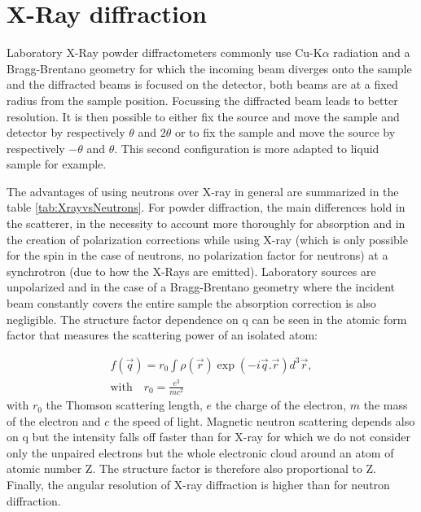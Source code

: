 \section{X-Ray diffraction}

Laboratory X-Ray powder diffractometers commonly use Cu-K$\alpha$ radiation and a Bragg-Brentano geometry for which the incoming beam diverges onto the sample and the diffracted beams is focused on the detector, both beams are at a fixed radius from the sample position. Focussing the diffracted beam leads to better resolution.
It is then possible to either fix the source and move the sample and detector by respectively $\theta$ and $2\theta$ or to fix the sample and move the source by respectively $-\theta$ and $\theta$. This second configuration is more adapted to liquid sample for example.

The advantages of using neutrons over X-ray in general are summarized in the table \ref{tab:XrayvsNeutrons}. For powder diffraction, the main differences hold in the scatterer, in the necessity to account more thoroughly for absorption and in the creation of polarization corrections while using X-ray (which is only possible for the spin in the case of neutrons, no polarization factor for neutrons) at a synchrotron (due to how the X-Rays are emitted). Laboratory sources are unpolarized and in the case of a Bragg-Brentano geometry where the incident beam constantly covers the entire sample the absorption correction is also negligible.
The structure factor dependence on q can be seen in the atomic form factor that measures the scattering power of an isolated atom:

\begin{gather}
    \label{eq:AtomicFormFactor}
    f(\vec{q}) = r_0\int \rho(\vec{r}) \exp{(-i\vec{q}.\vec{r}) d^3\vec{r}},\\
    \text{with} \quad r_0 = \frac{e^2}{mc^2}
\end{gather}{}
with $r_0$ the Thomson scattering length, $e$ the charge of the electron, $m$ the mass of the electron and $c$ the speed of light. Magnetic neutron scattering depends also on q but the intensity falls off faster than for X-ray for which we do not consider only the unpaired electrons but the whole electronic cloud around an atom of atomic number Z. The structure factor is therefore also proportional to Z. Finally, the angular resolution of X-ray diffraction is higher than for neutron diffraction.

